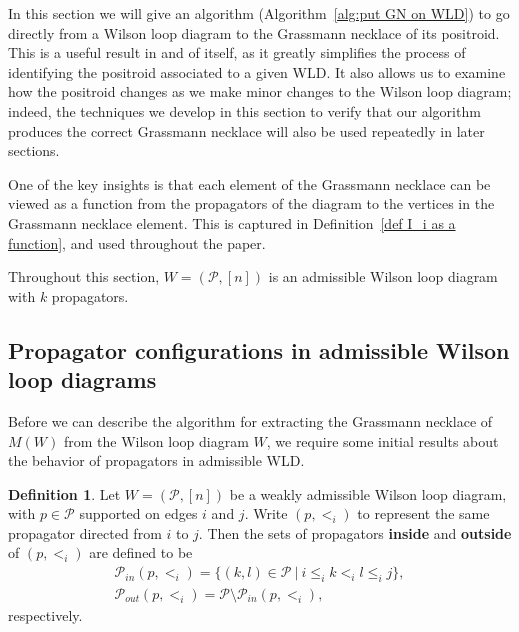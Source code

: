 \documentclass[11pt]{article}
\newcommand{\note}{\todo[color=green!40]}
\newcommand{\cP}{\mathcal{P}}
\theoremstyle{remark}
\theoremstyle{definition}
\newtheorem{dfn}[thm]{Definition}
\begin{document}
In this section we will give an algorithm (Algorithm~\ref{alg:put GN on WLD}) to go directly from a Wilson loop diagram to the Grassmann necklace of its positroid. This is a useful result in and of itself, as it greatly simplifies the process of identifying the positroid associated to a given WLD. It also allows us to examine how the positroid changes as we make minor changes to the Wilson loop diagram; indeed, the techniques we develop in this section to verify that our algorithm produces the correct Grassmann necklace will also be used repeatedly in later sections.

One of the key insights is that each element of the Grassmann necklace can be viewed as a function from the propagators of the diagram to the vertices in the Grassmann necklace element.  This is captured in Definition~\ref{def I_i as a function}, and used throughout the paper.




Throughout this section, $W = (\cP,[n])$ is an admissible Wilson loop diagram with $k$ propagators.





\subsection{Propagator configurations in admissible Wilson loop diagrams}\label{sec:propagator configs}

Before we can describe the algorithm for extracting the Grassmann necklace of $M(W)$ from the Wilson loop diagram $W$, we require some initial results about the behavior of propagators in admissible WLD.



\begin{dfn}\label{props inside p}
Let $W = (\cP, [n])$ be a weakly admissible Wilson loop diagram, with $p \in \cP$ supported on edges $i$ and $j$. Write $(p, <_i)$ to represent the same propagator directed from $i$ to $j$. Then the sets of propagators {\bf inside} and {\bf outside} of $(p,<_i)$ are defined to be
\begin{gather*}\cP_{in}(p,<_i) = \{ (k,l) \in \cP \ |\ i \leq_i k <_i l \leq_i j \}, \\
\cP_{out}(p,<_i) = \cP\setminus \cP_{in}(p,<_i),
\end{gather*}
respectively.
\end{dfn}
\end{document}
